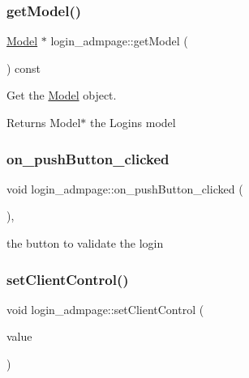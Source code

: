 \subsubsection{\texorpdfstring{get\+Model()}{getModel()}}
{\footnotesize\ttfamily \hyperlink{classModel}{Model} $\ast$ login\+\_\+admpage\+::get\+Model (\begin{DoxyParamCaption}{ }\end{DoxyParamCaption}) const}



Get the \hyperlink{classModel}{Model} object. 

\begin{DoxyReturn}{Returns}
Model$\ast$ the Login\textquotesingle{}s model 
\end{DoxyReturn}
\mbox{\label{classlogin__admpage_a5c5d7211f6efd8808e4af7ac4b935b25}} 
\subsubsection{\texorpdfstring{on\+\_\+push\+Button\+\_\+clicked}{on\_pushButton\_clicked}}
{\footnotesize\ttfamily void login\+\_\+admpage\+::on\+\_\+push\+Button\+\_\+clicked (\begin{DoxyParamCaption}{ }\end{DoxyParamCaption})\hspace{0.3cm}{\ttfamily [private]}, {\ttfamily [slot]}}



the button to validate the login 

\mbox{\label{classlogin__admpage_ae14083eb7d35e84e666b65124814a9f2}} 
\subsubsection{\texorpdfstring{set\+Client\+Control()}{setClientControl()}}
{\footnotesize\ttfamily void login\+\_\+admpage\+::set\+Client\+Control (\begin{DoxyParamCaption}\item[{\hyperlink{classClientControl}{Client\+Control} $\ast$}]{value }\end{DoxyParamCaption})}



